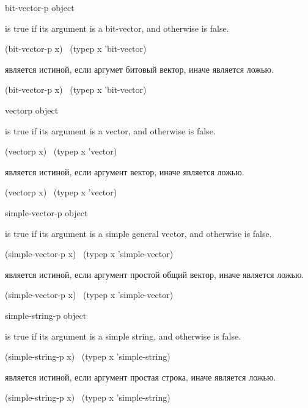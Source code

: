\begin{defun}[Function]
bit-vector-p object

 is true if its argument is a bit-vector,
and otherwise is false.
\begin{lisp}
(bit-vector-p x) \EQ\ (typep x 'bit-vector)
\end{lisp}

 является истиной, если аргумет битовый вектор, иначе является ложью.
\begin{lisp}
(bit-vector-p x) \EQ\ (typep x 'bit-vector)
\end{lisp}
\end{defun}

\begin{defun}[Function]
vectorp object

 is true if its argument is a vector,
and otherwise is false.
\begin{lisp}
(vectorp x) \EQ\ (typep x 'vector)
\end{lisp}

 является истиной, если аргумент вектор, иначе является ложью.
\begin{lisp}
(vectorp x) \EQ\ (typep x 'vector)
\end{lisp}
\end{defun}

\begin{defun}[Function]
simple-vector-p object

 is true if its argument is a simple general vector,
and otherwise is false.
\begin{lisp}
(simple-vector-p x) \EQ\ (typep x 'simple-vector)
\end{lisp}

 является истиной, если аргумент простой общий вектор, иначе
является ложью.
\begin{lisp}
(simple-vector-p x) \EQ\ (typep x 'simple-vector)
\end{lisp}
\end{defun}

\begin{defun}[Function]
simple-string-p object

 is true if its argument is a simple string,
and otherwise is false.
\begin{lisp}
(simple-string-p x) \EQ\ (typep x 'simple-string)
\end{lisp}

 является истиной, если аргумент простая строка, иначе
является ложью.
\begin{lisp}
(simple-string-p x) \EQ\ (typep x 'simple-string)
\end{lisp}
\end{defun}

